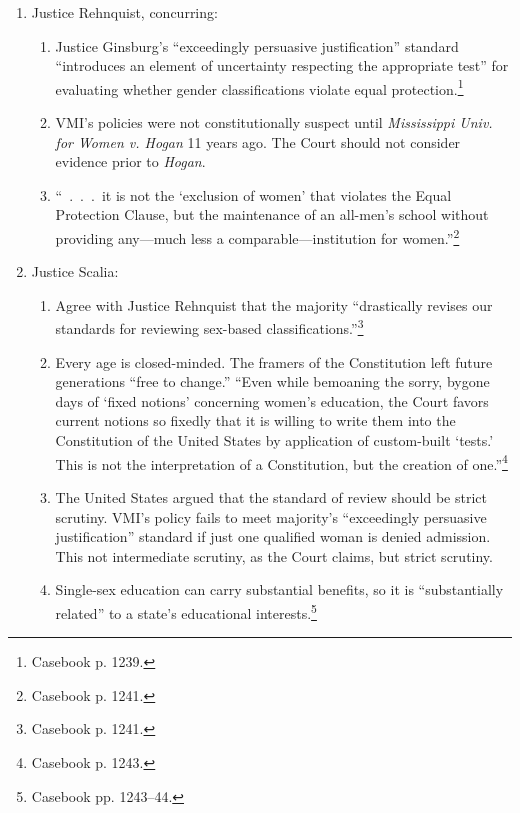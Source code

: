 \begin{enumerate}
\begin{enumerate}
        any gender-defined classification.''\footnote{Casebook p. 1237.} VWIL 
        was a separate but not equal institution.
    \end{enumerate}
    \item Justice Rehnquist, concurring:
    \begin{enumerate}
        \item Justice Ginsburg's ``exceedingly persuasive justification'' 
        standard ``introduces an element of uncertainty respecting the 
        appropriate test'' for evaluating whether gender classifications 
        violate equal protection.\footnote{Casebook p. 1239.}
        \item VMI's policies were not constitutionally suspect until 
        \emph{Mississippi Univ. for Women v. Hogan} 11 years ago. The Court 
        should not consider evidence prior to \emph{Hogan}.
        \item ``~.~.~.~it is not the `exclusion of women' that violates the 
        Equal Protection Clause, but the maintenance of an all-men's school 
        without providing any---much less a comparable---institution for 
        women.''\footnote{Casebook p. 1241.}
    \end{enumerate}
    \item Justice Scalia:
    \begin{enumerate}
        \item Agree with Justice Rehnquist that the majority ``drastically 
        revises our standards for reviewing sex-based 
        classifications.''\footnote{Casebook p. 1241.}
        \item Every age is closed-minded. The framers of the Constitution left 
        future generations ``free to change.'' ``Even while bemoaning the 
        sorry, bygone days of `fixed notions' concerning women's education, 
        the Court favors current notions so fixedly that it is willing to 
        write them into the Constitution of the United States by application 
        of custom-built `tests.' This is not the interpretation of a 
        Constitution, but the creation of one.''\footnote{Casebook p. 1243.}
        \item The United States argued that the standard of review should be 
        strict scrutiny. VMI's policy fails to meet majority's ``exceedingly 
        persuasive justification'' standard if just one qualified woman is 
        denied admission. This not intermediate scrutiny, as the Court claims, 
        but strict scrutiny.
        \item Single-sex education can carry substantial benefits, so it is 
        ``substantially related'' to a state's educational 
        interests.\footnote{Casebook pp. 1243--44.}
    \end{enumerate}
\end{enumerate}

